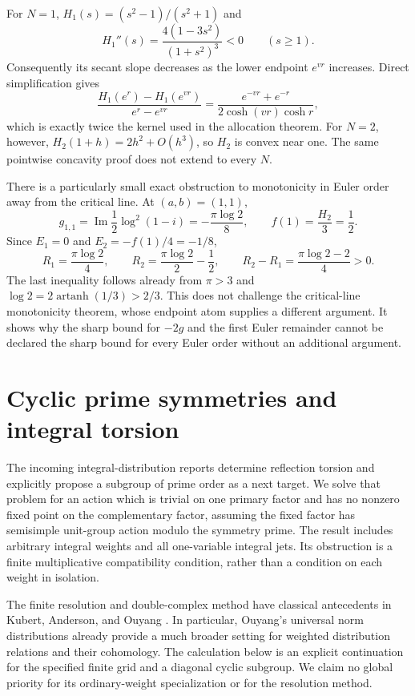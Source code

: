 \documentclass[11pt,a4paper]{article}
\numberwithin{equation}{section}
\theoremstyle{definition}
\theoremstyle{remark}
\begin{document}
For $N=1$, $H_1(s)=(s^2-1)/(s^2+1)$ and
\[
 H_1''(s)=\frac{4(1-3s^2)}{(1+s^2)^3}<0\qquad(s\ge1).
\]
Consequently its secant slope decreases as the lower endpoint $e^{vr}$
increases. Direct simplification gives
\[
 \frac{H_1(e^r)-H_1(e^{vr})}{e^r-e^{vr}}
 =\frac{e^{-vr}+e^{-r}}{2\cosh(vr)\cosh r},
\]
which is exactly twice the kernel used in the allocation theorem.
For $N=2$, however, $H_2(1+h)=2h^2+O(h^3)$, so $H_2$ is convex near
one. The same pointwise concavity proof does not extend to every $N$.

There is a particularly small exact obstruction to monotonicity in Euler
order away from the critical line. At $(a,b)=(1,1)$,
\[
 g_{1,1}=\operatorname{Im}\frac12\log^2(1-i)
       =-\frac{\pi\log2}{8},\qquad f(1)=\frac{H_2}{3}=\frac12.
\]
Since $E_1=0$ and $E_2=-f(1)/4=-1/8$,
\[
 R_1=\frac{\pi\log2}{4},\qquad
 R_2=\frac{\pi\log2}{2}-\frac12,
 \qquad R_2-R_1=\frac{\pi\log2-2}{4}>0.
\]
The last inequality follows already from $\pi>3$ and
$\log2=2\operatorname{artanh}(1/3)>2/3$.
This does not challenge the critical-line monotonicity theorem, whose
endpoint atom supplies a different argument. It shows why the sharp
bound for $-2g$ and the first Euler remainder cannot be declared the
sharp bound for every Euler order without an additional argument.


\section{Cyclic prime symmetries and integral torsion}
\label{cpc:sec:main}

The incoming integral-distribution reports \cite{integraljets} determine reflection torsion
and explicitly propose a subgroup of prime order as a next target.
We solve that problem for an action which is trivial on one primary
factor and has no nonzero fixed point on the complementary factor,
assuming the fixed factor has semisimple unit-group action modulo the
symmetry prime. The result includes arbitrary integral weights and all
one-variable integral jets. Its obstruction is a finite multiplicative
compatibility condition, rather than a condition on each weight in
isolation.

The finite resolution and double-complex method have classical
antecedents in Kubert, Anderson, and Ouyang
\cite{cpc:Kubert1979,cpc:Ouyang2001,cpc:Ouyang2002}.
In particular, Ouyang's universal norm distributions already provide a
much broader setting for weighted distribution relations and their
cohomology. The calculation below is an explicit continuation for the
specified finite grid and a diagonal cyclic subgroup. We claim no global
priority for its ordinary-weight specialization or for the resolution
method.
\end{document}
